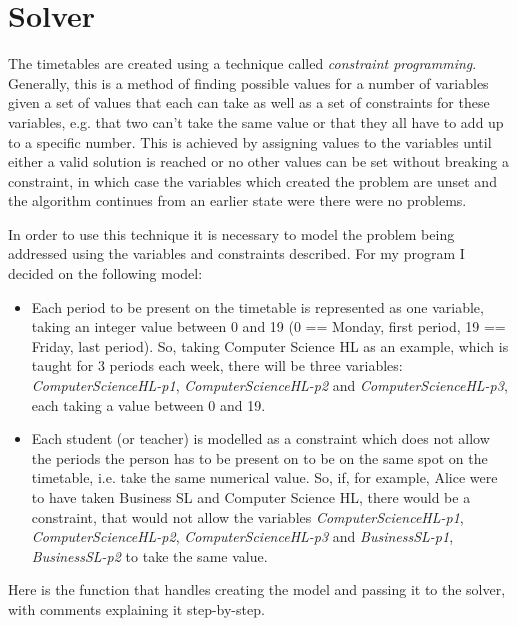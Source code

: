 \documentclass[12pt]{article}
\begin{document}
\section{Solver}

The timetables are created using a technique called \emph{constraint programming}.
Generally, this is a method of finding possible values for a number of variables given a set
of values that each can take as well as a set of constraints for these variables, e.g. that
two can't take the same value or that they all have to add up to a specific number.  This is
achieved by assigning values to the variables until either a valid solution is reached or no
other values can be set without breaking a constraint, in which case the variables which
created the problem are unset and the algorithm continues from an earlier state were there
were no problems.

In order to use this technique it is necessary to model the problem being addressed using
the variables and constraints described. For my program I decided on the following model:
%
\begin{itemize}
    \item Each period to be present on the timetable is represented as one variable, taking
        an integer value between 0 and 19 (0 == Monday, first period, 19 == Friday, last
        period). So, taking Computer Science HL as an example, which is taught for 3 periods
        each week, there will be three variables: \textit{ComputerScienceHL-p1},
        \textit{ComputerScienceHL-p2} and \textit{ComputerScienceHL-p3}, each taking a value
        between 0 and 19.

    \item Each student (or teacher) is modelled as a constraint which does not allow the
        periods the person has to be present on to be on the same spot on the timetable,
        i.e. take the same numerical value. So, if, for example, Alice were to have taken
        Business SL and Computer Science HL, there would be a constraint, that would not
        allow the variables \textit{ComputerScienceHL-p1}, \textit{ComputerScienceHL-p2},
        \textit{ComputerScienceHL-p3} and \textit{BusinessSL-p1}, \textit{BusinessSL-p2} to
        take the same value.
\end{itemize}
%

Here is the function that handles creating the model and passing it to the solver, with
comments explaining it step-by-step.
\newpage
\inputminted{python}{solver_listing.py}

\printbibliography[type=software,title={Libraries}]
\end{document}
